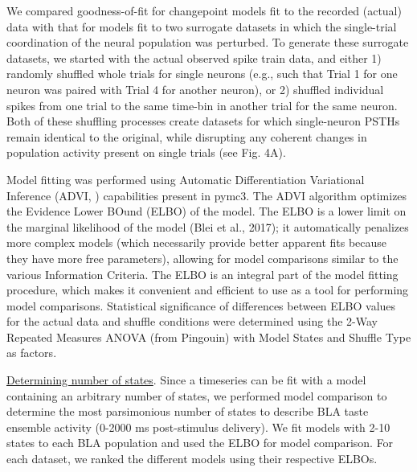\begin{refsection}
\noindent We compared goodness-of-fit for changepoint models fit to the recorded (actual) data with that for models fit to two surrogate datasets in which the single-trial coordination of the neural population was perturbed. To generate these surrogate datasets, we started with the actual observed spike train data, and either 1) randomly shuffled whole trials for single neurons (e.g., such that Trial 1 for one neuron was paired with Trial 4 for another neuron), or 2) shuffled individual spikes from one trial to the same time-bin in another trial for the same neuron. Both of these shuffling processes create datasets for which single-neuron PSTHs remain identical to the original, while disrupting any coherent changes in population activity present on single trials (see Fig. 4A).  

\noindent Model fitting was performed using Automatic Differentiation Variational Inference (ADVI, \cite{kucukelbir2016a}) capabilities present in pymc3. The ADVI algorithm optimizes the Evidence Lower BOund (ELBO) of the model. The ELBO is a lower limit on the marginal likelihood of the model (Blei et al., 2017); it automatically penalizes more complex models (which necessarily provide better apparent fits because they have more free parameters), allowing for model comparisons similar to the various Information Criteria. The ELBO is an integral part of the model fitting procedure, which makes it convenient and efficient to use as a tool for performing model comparisons. Statistical significance of differences between ELBO values for the actual data and shuffle conditions were determined using the 2-Way Repeated Measures ANOVA (from Pingouin) with Model States and Shuffle Type as factors.

\noindent\underline{Determining number of states}. Since a timeseries can be fit with a model containing an arbitrary number of states, we performed model comparison to determine the most parsimonious number of states to describe BLA taste ensemble activity (0-2000 ms post-stimulus delivery). We fit models with 2-10 states to each BLA population and used the ELBO for model comparison.  For each dataset, we ranked the different models using their respective ELBOs. 


\end{refsection}
